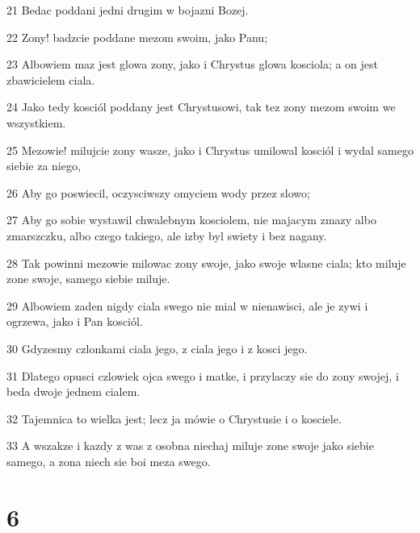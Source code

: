 \par 21 Bedac poddani jedni drugim w bojazni Bozej.
\par 22 Zony! badzcie poddane mezom swoim, jako Panu;
\par 23 Albowiem maz jest glowa zony, jako i Chrystus glowa kosciola; a on jest zbawicielem ciala.
\par 24 Jako tedy kosciól poddany jest Chrystusowi, tak tez zony mezom swoim we wszystkiem.
\par 25 Mezowie! milujcie zony wasze, jako i Chrystus umilowal kosciól i wydal samego siebie za niego,
\par 26 Aby go poswiecil, oczysciwszy omyciem wody przez slowo;
\par 27 Aby go sobie wystawil chwalebnym kosciolem, nie majacym zmazy albo zmarszczku, albo czego takiego, ale izby byl swiety i bez nagany.
\par 28 Tak powinni mezowie milowac zony swoje, jako swoje wlasne ciala; kto miluje zone swoje, samego siebie miluje.
\par 29 Albowiem zaden nigdy ciala swego nie mial w nienawisci, ale je zywi i ogrzewa, jako i Pan kosciól.
\par 30 Gdyzesmy czlonkami ciala jego, z ciala jego i z kosci jego.
\par 31 Dlatego opusci czlowiek ojca swego i matke, i przylaczy sie do zony swojej, i beda dwoje jednem cialem.
\par 32 Tajemnica to wielka jest; lecz ja mówie o Chrystusie i o kosciele.
\par 33 A wszakze i kazdy z was z osobna niechaj miluje zone swoje jako siebie samego, a zona niech sie boi meza swego.

\chapter{6}

